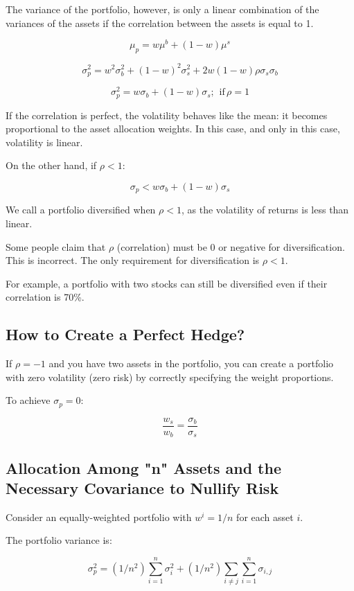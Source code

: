 \documentclass{article}
\begin{document}
The variance of the portfolio, however, is only a linear combination of the variances of the assets if the correlation between the assets is equal to 1.

$$
{\mu}_{p}=w{\mu}^{b}+(1-w){\mu}^{s}
$$

$$
{\sigma}_{p}^{2}=w^{2}{\sigma}_{b}^{2}+(1-w)^{2}{\sigma}_{s}^{2}+2w(1-w){\rho}{\sigma}_{s}{\sigma}_{b}
$$

$$
{\sigma}_{p}^{2}=w{\sigma}_{b}+(1-w){\sigma}_{s};  \hspace{5pt}   \text{if} \hspace{2pt} {\rho}=1
$$

If the correlation is perfect, the volatility behaves like the mean: it becomes proportional to the asset allocation weights. In this case, and only in this case, volatility is linear.

On the other hand, if ${\rho}<1$:

$$
{\sigma}_{p}<w{\sigma}_{b}+(1-w){\sigma}_{s}
$$

We call a portfolio diversified when ${\rho}<1$, as the volatility of returns is less than linear.

Some people claim that ${\rho}$ (correlation) must be 0 or negative for diversification. This is incorrect. The only requirement for diversification is ${\rho}<1$.

For example, a portfolio with two stocks can still be diversified even if their correlation is 70\%.

\subsection{How to Create a Perfect Hedge?}
If ${\rho}=-1$ and you have two assets in the portfolio, you can create a portfolio with zero volatility (zero risk) by correctly specifying the weight proportions.

To achieve ${\sigma_{p}}=0$:

$$
\frac{w_{s}}{w_{b}}=\frac{{\sigma}_{b}}{{\sigma}_{s}}
$$

\subsection{Allocation Among "n" Assets and the Necessary Covariance to Nullify Risk}
Consider an equally-weighted portfolio with $w^{i}=1/n$ for each asset $i$.

The portfolio variance is:

$$
{\sigma}_{p}^{2}=(1/n^{2}){\sum_{i=1}^{n}}{\sigma}_{i}^{2}+(1/n^{2}){\sum_{i{\neq}j}}{\sum_{i=1}^{n}}{\sigma}_{i, j}
$$
\end{document}
